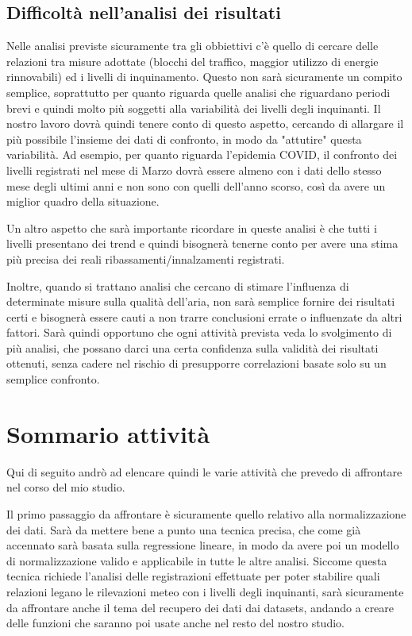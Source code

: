 \documentclass{article}
\begin{document}
\subsection{Difficoltà nell'analisi dei risultati}
Nelle analisi previste sicuramente tra gli obbiettivi c'è quello di cercare delle relazioni tra misure adottate (blocchi del traffico, maggior utilizzo di energie rinnovabili) ed i livelli di inquinamento. Questo non sarà sicuramente un compito semplice, soprattutto per quanto riguarda quelle analisi che riguardano periodi brevi e quindi molto più soggetti alla variabilità dei livelli degli inquinanti. Il nostro lavoro dovrà quindi tenere conto di questo aspetto, cercando di allargare il più possibile l'insieme dei dati di confronto, in modo da "attutire" questa variabilità. Ad esempio, per quanto riguarda l'epidemia COVID, il confronto dei livelli registrati nel mese di Marzo dovrà essere almeno con i dati dello stesso mese degli ultimi anni e non sono con quelli dell'anno scorso, così da avere un miglior quadro della situazione.

Un altro aspetto che sarà importante ricordare in queste analisi è che tutti i livelli presentano dei trend e quindi bisognerà tenerne conto per avere una stima più precisa dei reali ribassamenti/innalzamenti registrati.

Inoltre, quando si trattano analisi che cercano di stimare l'influenza di determinate misure sulla qualità dell'aria, non sarà semplice fornire dei risultati certi e bisognerà essere cauti a non trarre conclusioni errate o influenzate da altri fattori. Sarà quindi opportuno che ogni attività prevista veda lo svolgimento di più analisi, che possano darci una certa confidenza sulla validità dei risultati ottenuti, senza cadere nel rischio di presupporre correlazioni basate solo su un semplice confronto.


\section{Sommario attività}
Qui di seguito andrò ad elencare quindi le varie attività che prevedo di affrontare nel corso del mio studio.

Il primo passaggio da affrontare è sicuramente quello relativo alla normalizzazione dei dati. Sarà da mettere bene a punto una tecnica precisa, che come già accennato sarà basata sulla regressione lineare, in modo da avere poi un modello di normalizzazione valido e applicabile in tutte le altre analisi. Siccome questa tecnica richiede l'analisi delle registrazioni effettuate per poter stabilire quali relazioni legano le rilevazioni meteo con i livelli degli inquinanti, sarà sicuramente da affrontare anche il tema del recupero dei dati dai datasets, andando a creare delle funzioni che saranno poi usate anche nel resto del nostro studio.
\end{document}
